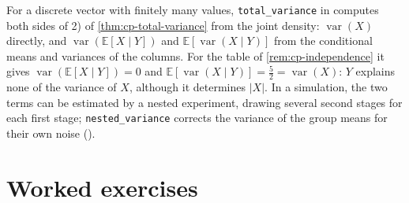 \begin{remark}[computational]\label{rem:cp-code-variance}
For a discrete vector with finitely many values, \texttt{total\_variance} in
 computes both sides of 2) of
\cref{thm:cp-total-variance} from the joint density: $\operatorname{var}(X)$ directly, and
$\operatorname{var}(\mathbb E[X\mid Y])$ and $\mathbb E[\operatorname{var}(X\mid Y)]$ from the
conditional means and variances of the columns. For the table of \cref{rem:cp-independence} it
gives $\operatorname{var}(\mathbb E[X\mid Y])=0$ and $\mathbb E[\operatorname{var}(X\mid Y)]=\frac52=\operatorname{var}(X)$:
$Y$ explains none of the variance of $X$, although it determines $|X|$. In a simulation, the two
terms can be estimated by a nested experiment, drawing several second stages for each first stage;
\texttt{nested\_variance} corrects the variance of the group means for their own noise
().
\end{remark}

\section{Worked exercises}\label{sec:cp-worked}

